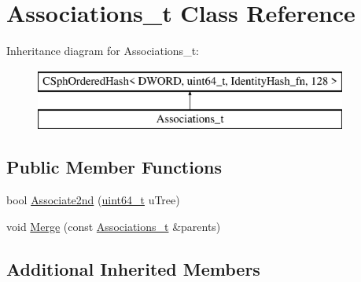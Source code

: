 \hypertarget{classAssociations__t}{\section{Associations\-\_\-t Class Reference}
\label{classAssociations__t}
}
Inheritance diagram for Associations\-\_\-t\-:\begin{figure}[H]
\begin{center}
\leavevmode
\includegraphics[height=2.000000cm]{classAssociations__t}
\end{center}
\end{figure}
\subsection*{Public Member Functions}
\begin{DoxyCompactItemize}
\item 
bool \hyperlink{classAssociations__t_ab9303caeba468dd9edf85f7657fd4b7a}{Associate2nd} (\hyperlink{sphinxstd_8h_aaa5d1cd013383c889537491c3cfd9aad}{uint64\-\_\-t} u\-Tree)
\item 
void \hyperlink{classAssociations__t_af53d3e70dcbce5e0aa8239099e2eb568}{Merge} (const \hyperlink{classAssociations__t}{Associations\-\_\-t} \&parents)
\end{DoxyCompactItemize}
\subsection*{Additional Inherited Members}


